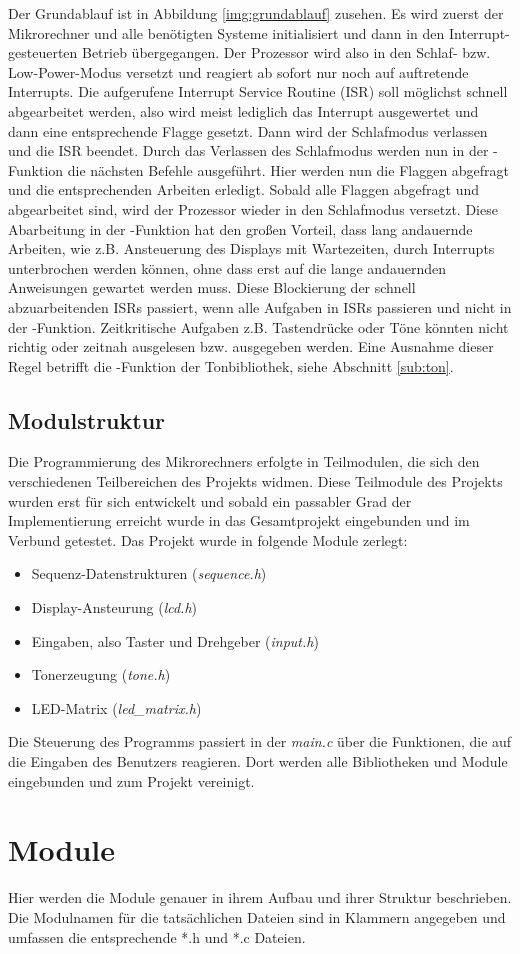 \newline
Der Grundablauf ist in Abbildung \ref{img:grundablauf} zusehen. Es wird zuerst der Mikrorechner und alle benötigten Systeme initialisiert und dann in den Interrupt-gesteuerten Betrieb übergegangen. Der Prozessor wird also in den Schlaf- bzw. Low-Power-Modus versetzt und reagiert ab sofort nur noch auf auftretende Interrupts. Die aufgerufene Interrupt Service Routine (ISR) soll möglichst schnell abgearbeitet werden, also wird meist lediglich das Interrupt ausgewertet und dann eine entsprechende Flagge gesetzt. Dann wird der Schlafmodus verlassen und die ISR beendet. Durch das Verlassen des Schlafmodus werden nun in der -Funktion die nächsten Befehle ausgeführt. Hier werden nun die Flaggen abgefragt und die entsprechenden Arbeiten erledigt. Sobald alle Flaggen abgefragt und abgearbeitet sind, wird der Prozessor wieder in den Schlafmodus versetzt. Diese Abarbeitung in der -Funktion hat den großen Vorteil, dass lang andauernde Arbeiten, wie z.B. Ansteuerung des Displays mit Wartezeiten, durch Interrupts unterbrochen werden können, ohne dass erst auf die lange andauernden Anweisungen gewartet werden muss. Diese Blockierung der schnell abzuarbeitenden ISRs passiert, wenn alle Aufgaben in ISRs passieren und nicht in der -Funktion. Zeitkritische Aufgaben z.B. Tastendrücke oder Töne könnten nicht richtig oder zeitnah ausgelesen bzw. ausgegeben werden. Eine Ausnahme dieser Regel betrifft die -Funktion der Tonbibliothek, siehe Abschnitt \ref{sub:ton}.%

\subsection{Modulstruktur}
Die Programmierung des Mikrorechners erfolgte in Teilmodulen, die sich den verschiedenen Teilbereichen des Projekts widmen. Diese Teilmodule des Projekts wurden erst für sich entwickelt und sobald ein passabler Grad der Implementierung erreicht wurde in das Gesamtprojekt eingebunden und im Verbund getestet. Das Projekt wurde in folgende Module zerlegt:
\begin{itemize}
    \item Sequenz-Datenstrukturen (\textsl{sequence.h})
	\item Display-Ansteurung (\textsl{lcd.h})
	\item Eingaben, also Taster und Drehgeber (\textsl{input.h})
	\item Tonerzeugung (\textsl{tone.h})
	\item LED-Matrix (\textsl{led\_matrix.h})
\end{itemize}
Die Steuerung des Programms passiert in der \textsl{main.c} über die Funktionen, die auf die Eingaben des Benutzers reagieren. Dort werden alle Bibliotheken und Module eingebunden und zum Projekt vereinigt.

\section{Module}
Hier werden die Module genauer in ihrem Aufbau und ihrer Struktur beschrieben. Die Modulnamen für die tatsächlichen Dateien sind in Klammern angegeben und umfassen die entsprechende *.h und *.c Dateien.
